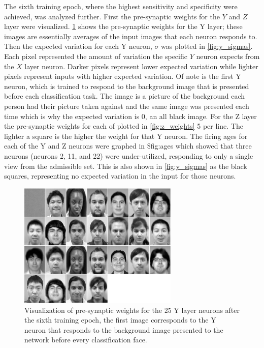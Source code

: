\documentclass[conference]{IEEEtran}
\begin{document}
The sixth training epoch, where the highest sensitivity and specificity were achieved, was analyzed further.  First the pre-synaptic weights for the $Y$ and $Z$ layer were visualized.  \ref{fig:y_weights} shows the pre-synaptic weights for the Y layer; these images are essentially averages of the input images that each neuron responds to.  Then the expected variation for each Y neuron, $\sigma$ was plotted in \ref{fig:y_sigmas}.  Each pixel represented the amount of variation the specific $Y$ neuron expects from the $X$ layer neuron.  Darker pixels represent lower expected variation while lighter pixels represent inputs with higher expected variation.  Of note is the first Y neuron, which is trained to respond to the background image that is presented before each classification task.  The image is a picture of the background each person had their picture taken against and the same image was presented each time which is why the expected variation is 0, an all black image.  For the Z layer the pre-synaptic weights for each of plotted in \ref{fig:z_weights} 5 per line. The lighter a square is the higher the weight for that Y neuron.  The firing ages for each of the Y and Z neurons were graphed in \${fig:ages} which showed that three neurons (neurons 2, 11, and 22) were under-utilized, responding to only a single view from the admissible set.  This is also shown in \ref{fig:y_sigmas} as the black squares, representing no expected variation in the input for those neurons.

\begin{figure}
\center
\includegraphics[width=3in]{figs/epoch_5_0_xy}
\caption{Visualization of pre-synaptic weights for the 25 Y layer neurons after the sixth training epoch, the first image corresponds to the Y neuron that responds to the background image presented to the network before every classification face.}
\label{fig:y_weights}
\end{figure}
\end{document}
